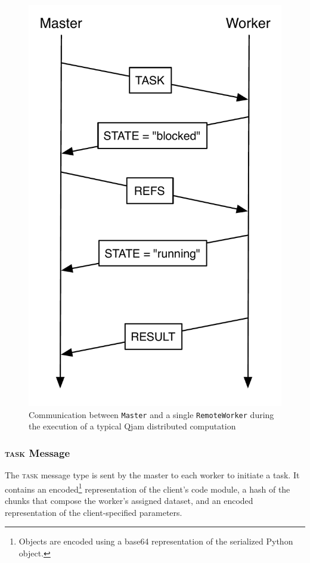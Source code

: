\documentclass[%
  final,
  notitlepage,
  narroweqnarray,
  inline,
]{ieee}
\begin{document}
\begin{figure}[!h]
  \centering
  \includegraphics[scale=0.35]{protocol-diagram.pdf}
  \caption{Communication between \texttt{Master} and a single
           \texttt{RemoteWorker} during the execution of a typical Qjam
           distributed computation}
  \label{ProtocolDiagram}
\end{figure}


\subsubsection{\textsc{task} Message}

The \textsc{task} message type is sent by the master to each worker to initiate
a task. It contains an encoded\footnote{Objects are encoded using a base64
  representation of the serialized Python object.} representation of the
client's code module, a hash of the chunks that compose the worker's assigned
dataset, and an encoded representation of the client-specified parameters.
\end{document}
